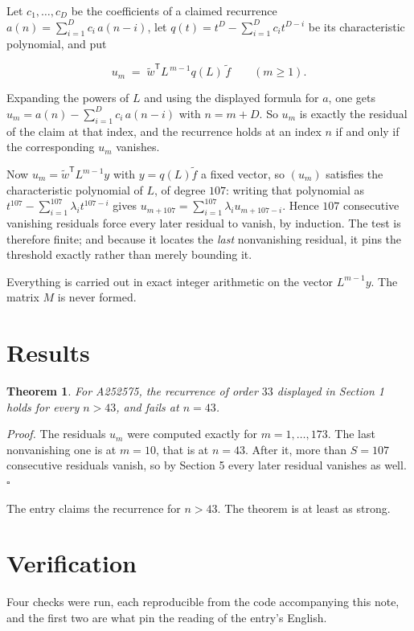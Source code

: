 \documentclass[11pt]{article}
\newtheorem{theorem}{Theorem}
\theoremstyle{definition}
\begin{document}
Let $c_1,\dots,c_D$ be the coefficients of a claimed recurrence $a(n) = \sum_{i=1}^{D} c_i\,a(n-i)$, let $q(t) = t^{D} - \sum_{i=1}^{D} c_i t^{D-i}$ be its characteristic polynomial, and put

\[u_m \;=\; \tilde w^{\mathsf T} L^{\,m-1} q(L)\,\tilde f \qquad (m \ge 1).\]

Expanding the powers of $L$ and using the displayed formula for $a$, one gets $u_m = a(n) - \sum_{i=1}^{D} c_i\,a(n-i)$ with $n = m + D$. So $u_m$ is exactly the residual of the claim at that index, and the recurrence holds at an index $n$ if and only if the corresponding $u_m$ vanishes.

Now $u_m = \tilde w^{\mathsf T} L^{m-1} y$ with $y = q(L)\tilde f$ a fixed vector, so $(u_m)$ satisfies the characteristic polynomial of $L$, of degree $107$: writing that polynomial as $t^{107} - \sum_{i=1}^{107} \lambda_i t^{107-i}$ gives $u_{m+107} = \sum_{i=1}^{107} \lambda_i u_{m+107-i}$. Hence $107$ consecutive vanishing residuals force every later residual to vanish, by induction. The test is therefore finite; and because it locates the {\itshape last} nonvanishing residual, it pins the threshold exactly rather than merely bounding it.

Everything is carried out in exact integer arithmetic on the vector $L^{m-1}y$. The matrix $M$ is never formed.

\section{Results}

\begin{theorem} For A252575, the recurrence of order $33$ displayed in Section 1 holds for every $n > 43$, and fails at $n = 43$.\end{theorem}

{\itshape Proof.} The residuals $u_m$ were computed exactly for $m = 1,\dots,173$. The last nonvanishing one is at $m = 10$, that is at $n = 43$. After it, more than $S = 107$ consecutive residuals vanish, so by Section 5 every later residual vanishes as well. $\square$

The entry claims the recurrence for $n > 43$. The theorem is at least as strong.

\section{Verification}

Four checks were run, each reproducible from the code accompanying this note, and the first two are what pin the reading of the entry's English.
\end{document}
